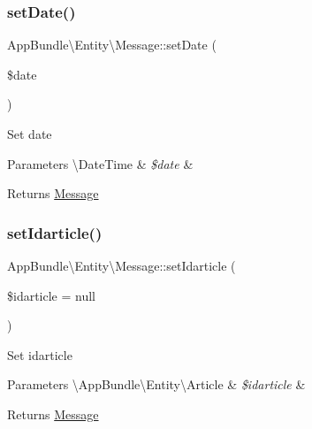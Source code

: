 \subsubsection{\texorpdfstring{set\+Date()}{setDate()}}
{\footnotesize\ttfamily App\+Bundle\textbackslash{}\+Entity\textbackslash{}\+Message\+::set\+Date (\begin{DoxyParamCaption}\item[{}]{\$date }\end{DoxyParamCaption})}

Set date


\begin{DoxyParams}[1]{Parameters}
\textbackslash{}\+Date\+Time & {\em \$date} & \\
\hline
\end{DoxyParams}
\begin{DoxyReturn}{Returns}
\hyperlink{class_app_bundle_1_1_entity_1_1_message}{Message} 
\end{DoxyReturn}
\mbox{\label{class_app_bundle_1_1_entity_1_1_message_ac74cd3520230e3ef8f70d668d0d7a4fc}} 
\subsubsection{\texorpdfstring{set\+Idarticle()}{setIdarticle()}}
{\footnotesize\ttfamily App\+Bundle\textbackslash{}\+Entity\textbackslash{}\+Message\+::set\+Idarticle (\begin{DoxyParamCaption}\item[{\textbackslash{}\hyperlink{class_app_bundle_1_1_entity_1_1_article}{App\+Bundle\textbackslash{}\+Entity\textbackslash{}\+Article}}]{\$idarticle = {\ttfamily null} }\end{DoxyParamCaption})}

Set idarticle


\begin{DoxyParams}[1]{Parameters}
\textbackslash{}\+App\+Bundle\textbackslash{}\+Entity\textbackslash{}\+Article & {\em \$idarticle} & \\
\hline
\end{DoxyParams}
\begin{DoxyReturn}{Returns}
\hyperlink{class_app_bundle_1_1_entity_1_1_message}{Message} 
\end{DoxyReturn}
\mbox{\label{class_app_bundle_1_1_entity_1_1_message_a3677de6fea7ce51a611e4703d8869e26}} 
